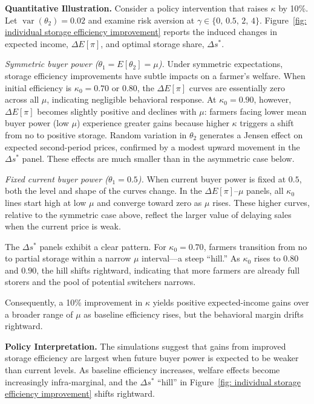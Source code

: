 \textbf{Quantitative Illustration.} 
Consider a policy intervention that raises $\kappa$ by 10\%. Let $\operatorname{var}(\theta_2)=0.02$ and examine risk aversion at $\gamma \in \{0,\,0.5,\,2,\,4\}$. Figure~\ref{fig: individual storage efficiency improvement} reports the induced changes in expected income, $\Delta E[\pi]$, and optimal storage share, $\Delta s^*$.

\emph{Symmetric buyer power ($\theta_1 = E[\theta_2] =\mu$).} 
Under symmetric expectations, storage efficiency improvements have subtle impacts on a farmer's welfare. When initial efficiency is $\kappa_0 = 0.70$ or $0.80$, the $\Delta E[\pi]$ curves are essentially zero across all $\mu$, indicating negligible behavioral response. At $\kappa_0 = 0.90$, however, $\Delta E[\pi]$ becomes slightly positive and declines with $\mu$: farmers facing lower mean buyer power (low $\mu$) experience greater gains because higher $\kappa$ triggers a shift from no to positive storage. Random variation in $\theta_2$ generates a Jensen effect on expected second-period prices, confirmed by a modest upward movement in the $\Delta s^*$ panel. These effects are much smaller than in the asymmetric case below.


\emph{Fixed current buyer power ($\theta_1 = 0.5$).} 
When current buyer power is fixed at $0.5$, both the level and shape of the curves change. In the $\Delta E[\pi]$--$\mu$ panels, all $\kappa_0$ lines start high at low $\mu$ and converge toward zero as $\mu$ rises. These higher curves, relative to the symmetric case above, reflect the larger value of delaying sales when the current price is weak. 

The $\Delta s^*$ panels exhibit a clear pattern. For $\kappa_0 = 0.70$, farmers transition from no to partial storage within a narrow $\mu$ interval---a steep ``hill.'' As $\kappa_0$ rises to $0.80$ and $0.90$, the hill shifts rightward, indicating that more farmers are already full storers and the pool of potential switchers narrows. 

Consequently, a 10\% improvement in $\kappa$ yields positive expected-income gains over a broader range of $\mu$ as baseline efficiency rises, but the behavioral margin drifts rightward.


\textbf{Policy Interpretation.} 
The simulations suggest that gains from improved storage efficiency are largest when future buyer power is expected to be weaker than current levels. As baseline efficiency increases, welfare effects become increasingly infra-marginal, and the $\Delta s^*$ ``hill'' in Figure~\ref{fig: individual storage efficiency improvement} shifts rightward. 

